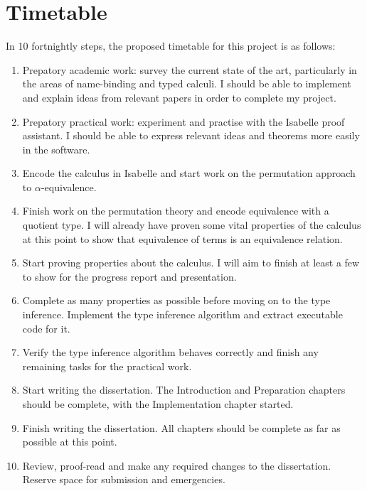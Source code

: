 \documentclass[12pt]{article}
\begin{document}
\section*{Timetable}
In 10 fortnightly steps, the proposed timetable for this project is as follows:
\begin{enumerate}
\item
Prepatory academic work: survey the current state of the art, particularly in the areas of name-binding and typed calculi.
I should be able to implement and explain ideas from relevant papers in order to complete my project.
\item
Prepatory practical work: experiment and practise with the Isabelle proof assistant.
I should be able to express relevant ideas and theorems more easily in the software.
\item
Encode the calculus in Isabelle and start work on the permutation approach to \(\alpha\)-equivalence.
\item
Finish work on the permutation theory and encode equivalence with a quotient type.
I will already have proven some vital properties of the calculus at this point to show that equivalence of terms is an equivalence relation.
\item
Start proving properties about the calculus.
I will aim to finish at least a few to show for the progress report and presentation.
\item
Complete as many properties as possible before moving on to the type inference.
Implement the type inference algorithm and extract executable code for it.
\item
Verify the type inference algorithm behaves correctly and finish any remaining tasks for the practical work.
\item
Start writing the dissertation.
The Introduction and Preparation chapters should be complete, with the Implementation chapter started.
\item
Finish writing the dissertation.
All chapters should be complete as far as possible at this point.
\item
Review, proof-read and make any required changes to the dissertation.
Reserve space for submission and emergencies.
\end{enumerate}
\printbibliography
\end{document}
